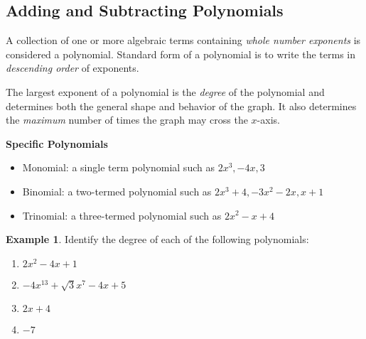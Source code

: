 \documentclass[addpoints,12pt]{exam}
\theoremstyle{definition}
\theoremstyle{break}
\theoremstyle{break}
\newtheorem{example}{Example}[subsection]
\begin{document}
\setcounter{section}{5}
\setcounter{subsection}{0}

\subsection{Adding and Subtracting Polynomials}

\vspace{.15in}

\begin{definition}[Polynomial]
A collection of one or more algebraic terms containing \emph{whole number exponents} is considered a polynomial. Standard form of a polynomial is to write the terms in \emph{descending order} of exponents.
\end{definition}
\vspace{.15in}

\begin{definition}[Degree]
The largest exponent of a polynomial is the \emph{degree} of the polynomial and determines both the general shape and behavior of the graph. It also determines the \emph{maximum} number of times the graph may cross the $x$-axis.
\end{definition}
\vspace{.15in}

\begin{mdframed}
\textbf{Specific Polynomials}
\begin{itemize}
\item Monomial: a single term polynomial such as $2x^3, -4x, 3$
\item Binomial: a two-termed polynomial such as $2x^3 + 4, -3x^2 - 2x, x+1$
\item Trinomial: a three-termed polynomial such as $2x^2-x+4$
\end{itemize}
\end{mdframed}

\begin{example}
Identify the degree of each of the following polynomials:
\begin{enumerate}
\item $2x^2 - 4x + 1$
\vspace{.25in}
\item $-4x^{13}+\sqrt{3}x^7 - 4x + 5$
\vspace{.25in}
\item $2x + 4$
\vspace{.25in}
\item $-7$
\vspace{.25in}
\end{enumerate}
\end{example}
\end{document}
